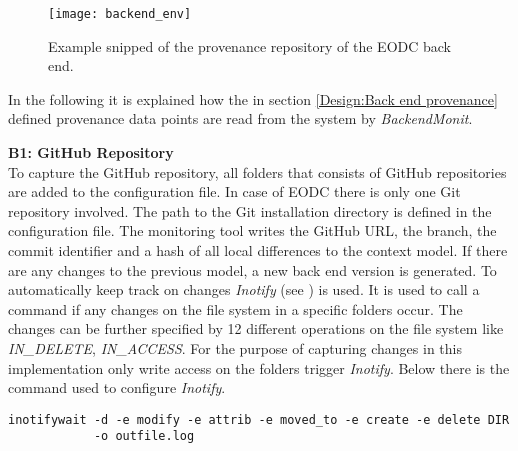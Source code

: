 \documentclass[draft,final]{vutinfth} %
\begin{document}
\begin{figure}[h]
	\centering
	\texttt{[image: backend\_env]}
	\caption{Example snipped of the provenance repository of the EODC back end.}
	\label{fig:backendprovcm} %
\end{figure}

In the following it is explained how the in section \ref{Design:Back end provenance} defined provenance data points are read from the system by \textit{BackendMonit}.  

\textbf{B1: GitHub Repository} \\
To capture the GitHub repository, all folders that consists of GitHub repositories are added to the configuration file. In case of EODC there is only one Git repository involved. The path to the Git installation directory is defined in the configuration file. The monitoring tool writes the GitHub URL, the branch, the commit identifier and a hash of all local differences to the context model. If there are any changes to the previous model, a new back end version is generated. To automatically keep track on changes \textit{Inotify} (see \cite{inotify}) is used. It is used to call a command if any changes on the file system in a specific folders occur. The changes can be further specified by 12 different operations on the file system like \textit{IN\_DELETE}, \textit{IN\_ACCESS}. For the purpose of capturing changes in this implementation only write access on the folders trigger \textit{Inotify}. Below there is the command used to configure \textit{Inotify}. \\
 
\begin{lstlisting}[frame=single]
inotifywait -d -e modify -e attrib -e moved_to -e create -e delete DIR 
		    -o outfile.log
\end{lstlisting}



\end{document}
